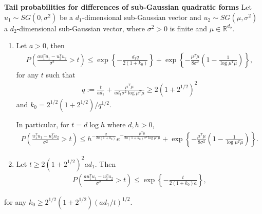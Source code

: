 \begin{lemma} {\bf Tail probabilities for differences of sub-Gaussian quadratic forms}
Let $u_1 \sim SG(0,\sigma^2)$ be a $d_1$-dimensional sub-Gaussian vector and $u_2 \sim SG(\mu, \sigma^2)$ a $d_2$-dimensional sub-Gaussian vector, where $\sigma^2 > 0$ is finite and $\mu \in \mathbb{R}^{d_2}$.

\begin{enumerate}[leftmargin=*,label=(\roman*)]
\item  Let $a>0$, then
\begin{align}
 P\left( \frac{a u_1^Tu_1 - u_2^Tu_2}{\sigma^2} > t \right) \leq
 \exp \left\{ - \frac{d_1 q }{2(1+k_0)}\right\} + \exp \left\{ - \frac{\mu^T\mu}{8\sigma^2} \left( 1 - \frac{1}{\log \mu^T\mu} \right) \right\},
\nonumber
\end{align}
for any $t$ such that
\begin{align}
 q:= \frac{t}{a d_1} + \frac{\mu^T\mu}{a d_1 \sigma^2 \log \mu^T\mu} \geq 2(1+2^{1/2})^2
\nonumber
\end{align}
and $k_0= 2^{1/2}(1+2^{1/2})/q^{1/2}$.

In particular, for $t= d \log h$ where $d,h>0$,
\begin{align}
 P\left( \frac{u_1^Tu_1 - u_2^Tu_2}{\sigma^2} > t \right) \leq
h^{-\frac{d}{2a(1+k_0)}} e^{-\frac{\mu^T\mu}{2a(1+k_0) \sigma^2 \log \mu^T\mu}}
+ \exp \left\{ - \frac{\mu^T\mu}{8\sigma^2} \left( 1 - \frac{1}{\log \mu^T\mu} \right) \right\}.
\nonumber
\end{align}

\item Let $t \geq 2(1+2^{1/2})^2 a d_1$. Then
\begin{align}
  P\left( \frac{a u_1^Tu_1 - u_2^Tu_2}{\sigma^2} > t \right) \leq \exp \left\{ -\frac{t}{2 (1+k_0) a} \right\},
\nonumber
\end{align}
\end{enumerate}
for any $k_0 \geq 2^{1/2}(1+2^{1/2}) (a d_1/t)^{1/2}$.

\label{lem:subgaussian_difquad_tail}
\end{lemma}



